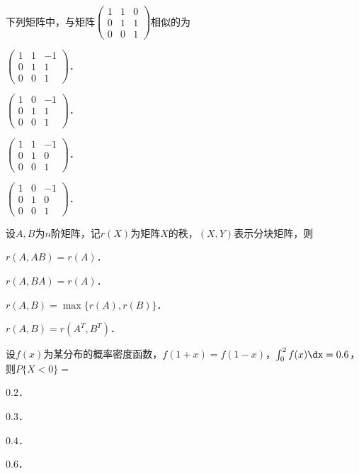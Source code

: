 \documentclass[plain,noanswer,medmath]{../../template/jnuexam}
\begin{document}
\begin{problem}
下列矩阵中，与矩阵$\begin{pmatrix}
  1 & 1 & 0 \\
  0 & 1 & 1 \\
  0 & 0 & 1
\end{pmatrix}$相似的为\pickout{}
\begin{abcd}
\item $\begin{pmatrix}
  1 & 1 & -1 \\
  0 & 1 & 1 \\
  0 & 0 & 1
\end{pmatrix}$．
\item $\begin{pmatrix}
  1 & 0 & -1 \\
  0 & 1 & 1 \\
  0 & 0 & 1
\end{pmatrix}$．
\item $\begin{pmatrix}
  1 & 1 & -1 \\
  0 & 1 & 0 \\
  0 & 0 & 1
\end{pmatrix}$．
\item $\begin{pmatrix}
  1 & 0 & -1 \\
  0 & 1 & 0 \\
  0 & 0 & 1
\end{pmatrix}$．
\end{abcd}
\end{problem}


\begin{problem}
设$A,B$为$n$阶矩阵，记$r(X)$为矩阵$X$的秩，$(X,Y)$表示分块矩阵，则\pickout{}
\begin{abcd}
\item $r(A,AB) = r(A)$．
\item $r(A,BA) = r(A)$．
\item $r(A,B) = \max\{r(A),r(B)\}$．
\item $r(A,B) = r(A^T,B^T)$．
\end{abcd}
\end{problem}


\begin{problem}
设$f(x)$为某分布的概率密度函数，$f\left(1 + x \right) = f(1 - x)$，$\int_0^2 f(x)\dx = 0.6$，
则$P\{X < 0\} =$\pickout{}
\begin{abcd}
\item $0.2$．
\item $0.3$．
\item $0.4$．
\item $0.6$．
\end{abcd}
\end{problem}
\end{document}
